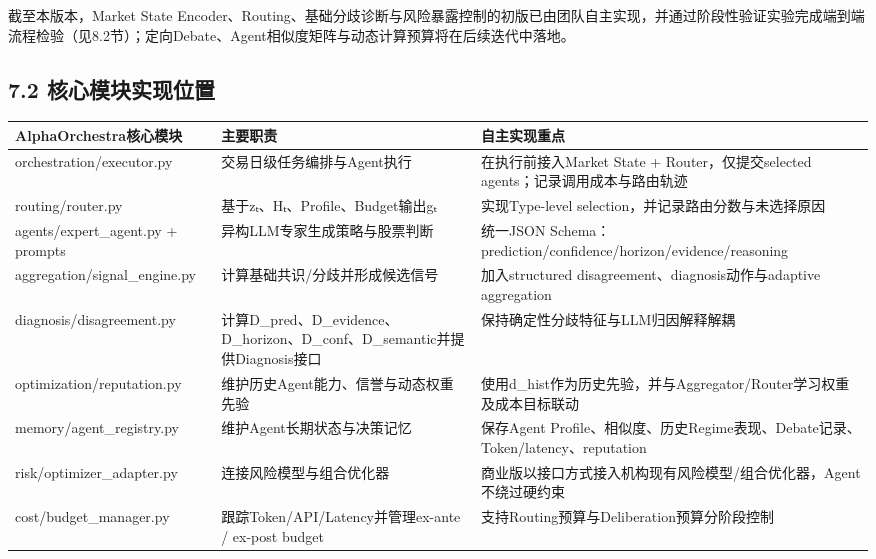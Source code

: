 \documentclass[12pt,a4paper]{ctexart}
\begin{document}
截至本版本，Market State
Encoder、Routing、基础分歧诊断与风险暴露控制的初版已由团队自主实现，并通过阶段性验证实验完成端到端流程检验（见8.2节）；定向Debate、Agent相似度矩阵与动态计算预算将在后续迭代中落地。

\subsection{\texorpdfstring{\textbf{7.2
核心模块实现位置}}{7.2 核心模块实现位置}}\label{ux6838ux5fc3ux6a21ux5757ux5b9eux73b0ux4f4dux7f6e}

\begin{longtable}[]{@{}
  >{\raggedright\arraybackslash}p{}
  >{\raggedright\arraybackslash}p{}
  >{\raggedright\arraybackslash}p{}@{}}
\toprule\noalign{}
\begin{minipage}[b]{\linewidth}\centering
\textbf{AlphaOrchestra核心模块}
\end{minipage} & \begin{minipage}[b]{\linewidth}\centering
\textbf{主要职责}
\end{minipage} & \begin{minipage}[b]{\linewidth}\centering
\textbf{自主实现重点}
\end{minipage} \\
\midrule\noalign{}
\endhead
\bottomrule\noalign{}
\endlastfoot
orchestration/executor.py & 交易日级任务编排与Agent执行 &
在执行前接入Market State + Router，仅提交selected
agents；记录调用成本与路由轨迹 \\
routing/router.py & 基于zₜ、Hₜ、Profile、Budget输出gₜ & 实现Type-level
selection，并记录路由分数与未选择原因 \\
agents/expert\_agent.py + prompts & 异构LLM专家生成策略与股票判断 &
统一JSON Schema：prediction/confidence/horizon/evidence/reasoning \\
aggregation/signal\_engine.py & 计算基础共识/分歧并形成候选信号 &
加入structured disagreement、diagnosis动作与adaptive aggregation \\
diagnosis/disagreement.py &
计算D\_pred、D\_evidence、D\_horizon、D\_conf、D\_semantic并提供Diagnosis接口
& 保持确定性分歧特征与LLM归因解释解耦 \\
optimization/reputation.py & 维护历史Agent能力、信誉与动态权重先验 &
使用d\_hist作为历史先验，并与Aggregator/Router学习权重及成本目标联动 \\
memory/agent\_registry.py & 维护Agent长期状态与决策记忆 & 保存Agent
Profile、相似度、历史Regime表现、Debate记录、Token/latency、reputation \\
risk/optimizer\_adapter.py & 连接风险模型与组合优化器 &
商业版以接口方式接入机构现有风险模型/组合优化器，Agent不绕过硬约束 \\
cost/budget\_manager.py & 跟踪Token/API/Latency并管理ex-ante / ex-post
budget & 支持Routing预算与Deliberation预算分阶段控制 \\
\end{longtable}
\end{document}
